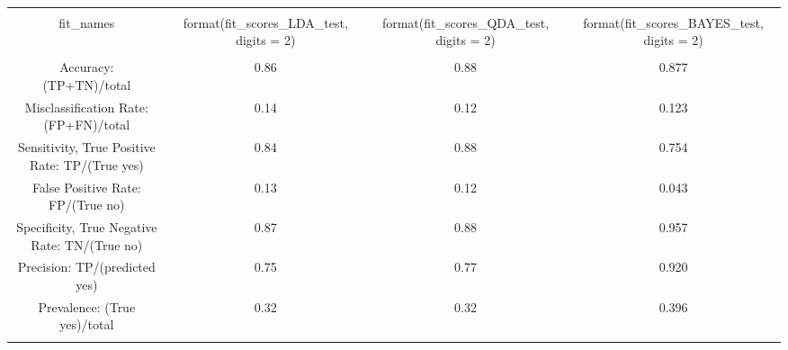 
\begin{table}[!htbp] \centering 
  \caption{} 
  \label{} 
\begin{tabular}{@{\extracolsep{5pt}} cccc} 
\\[-1.8ex]\hline 
\hline \\[-1.8ex] 
fit\_names & format(fit\_scores\_LDA\_test, digits = 2) & format(fit\_scores\_QDA\_test, digits = 2) & format(fit\_scores\_BAYES\_test, digits = 2) \\ 
\hline \\[-1.8ex] 
Accuracy: (TP+TN)/total & 0.86 & 0.88 & 0.877 \\ 
Misclassification Rate: (FP+FN)/total & 0.14 & 0.12 & 0.123 \\ 
Sensitivity, True Positive Rate: TP/(True yes) & 0.84 & 0.88 & 0.754 \\ 
False Positive Rate: FP/(True no) & 0.13 & 0.12 & 0.043 \\ 
Specificity, True Negative Rate: TN/(True no) & 0.87 & 0.88 & 0.957 \\ 
Precision: TP/(predicted yes) & 0.75 & 0.77 & 0.920 \\ 
Prevalence: (True yes)/total & 0.32 & 0.32 & 0.396 \\ 
\hline \\[-1.8ex] 
\end{tabular} 
\end{table} 
